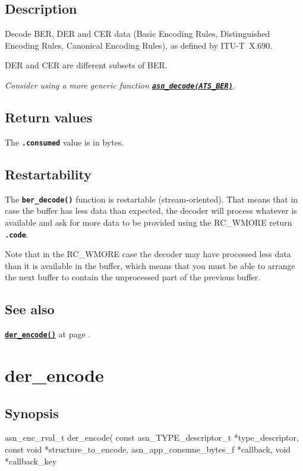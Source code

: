 \documentclass[english,oneside,12pt]{book}
\newcommand{\apisection}[2]{\clearpage\section{\label{#1}#2}}
\newcommand{\api}[2]{\hyperref[#1]{\code{#2}}}
\newcommand{\seealso}[2]{\api{#1}{#2} at page \pageref{#1}}
\newcommand{\code}[1]{\texttt{\textbf{\lstinline{#1}}}}
\begin{document}
\subsection*{Description}

Decode BER, DER and CER data
(Basic Encoding Rules, Distinguished Encoding Rules, Canonical Encoding Rules),
as defined by ITU-T~X.690.

DER and CER are different subsets of BER.\newline

\noindent\emph{Consider using a more generic function \api{sec:asn_decode}{asn_decode(ATS_BER)}.}

\subsection*{Return values}


The \code{.consumed} value is in bytes.

\subsection*{Restartability}

The \code{ber_decode()} function is restartable (stream-oriented).
That means that in case the buffer has less data than expected,
the decoder will process whatever is available and ask for more data
to be provided using the RC\_WMORE return \code{.code}.

Note that in the RC\_WMORE case the decoder may have processed less data than
it is available in the buffer, which means that you must be able to arrange
the next buffer to contain the unprocessed part of the previous buffer.

\subsection*{See also}
\seealso{sec:der_encode}{der_encode()}.

\apisection{sec:der_encode}{der\_encode}

\subsection*{Synopsis}

\begin{signature}
asn_enc_rval_t der_encode(
    const asn_TYPE_descriptor_t *type_descriptor,
    const void *structure_to_encode,
    asn_app_consume_bytes_f *callback,
    void *callback_key
\end{signature}
\end{document}
